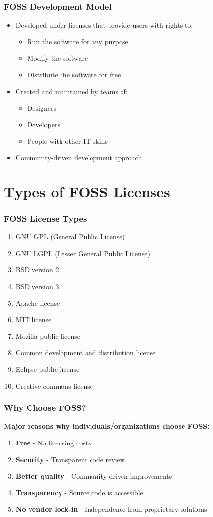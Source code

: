 \documentclass[aspectratio=169]{beamer}
\begin{document}
\begin{frame}
\frametitle{FOSS Development Model}
\begin{itemize}
\item Developed under licenses that provide users with rights to:
    \begin{itemize}
    \item Run the software for any purpose
    \item Modify the software
    \item Distribute the software for free
    \end{itemize}
\item Created and maintained by teams of:
    \begin{itemize}
    \item Designers
    \item Developers
    \item People with other IT skills
    \end{itemize}
\item Community-driven development approach
\end{itemize}
\end{frame}

\section{Types of FOSS Licenses}

\begin{frame}
\frametitle{FOSS License Types}
\begin{enumerate}
\item GNU GPL (General Public License)
\item GNU LGPL (Lesser General Public License)
\item BSD version 2
\item BSD version 3
\item Apache license
\item MIT license
\item Mozilla public license
\item Common development and distribution license
\item Eclipse public license
\item Creative commons license
\end{enumerate}
\end{frame}

\begin{frame}
\frametitle{Why Choose FOSS?}
\textbf{Major reasons why individuals/organizations choose FOSS:}
\begin{enumerate}
\item \textbf{Free} - No licensing costs
\item \textbf{Security} - Transparent code review
\item \textbf{Better quality} - Community-driven improvements
\item \textbf{Transparency} - Source code is accessible
\item \textbf{No vendor lock-in} - Independence from proprietary solutions
\end{enumerate}
\end{frame}
\end{document}
